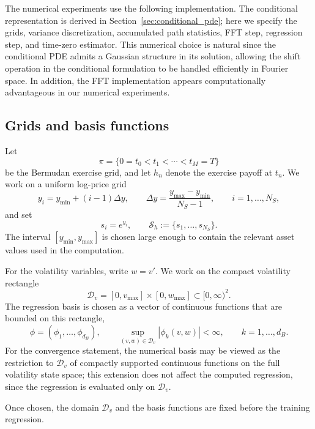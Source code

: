 \documentclass[pdflatex,sn-mathphys-num]{sn-jnl}
\theoremstyle{thmstyleone}%
\theoremstyle{thmstylethree}%
\theoremstyle{thmstyletwo}%
\begin{document}
The numerical experiments use the following implementation. The conditional
representation is derived in Section~\ref{sec:conditional_pde}; here we specify
the grids, variance discretization, accumulated path statistics, FFT step, regression step, and time-zero estimator. This numerical choice is natural since the conditional PDE admits a Gaussian structure in its solution, allowing the shift operation in the conditional formulation to be handled efficiently in Fourier space. In addition, the FFT implementation appears computationally advantageous in our numerical experiments.





\subsection{Grids and basis functions}
Let
$$
\pi=\{0=t_0<t_1<\cdots<t_M=T\}
$$
be the Bermudan exercise grid, and let $h_n$ denote the exercise payoff at
$t_n$. We work on a uniform log-price grid
$$
y_i=y_{\min}+(i-1)\Delta y,
\qquad
\Delta y=\frac{y_{\max}-y_{\min}}{N_S-1},
\qquad
i=1,\ldots,N_S,
$$
and set
$$
s_i=e^{y_i},
\qquad
\mathcal S_h:=\{s_1,\ldots,s_{N_S}\}.
$$
The interval $[y_{\min},y_{\max}]$ is chosen large enough to contain the
relevant asset values used in the computation.

For the volatility variables, write $w=v'$. We work on the compact volatility rectangle
\begin{equation}\label{eq:vol-domain}
\mathcal D_v=[0,v_{\max}]\times[0,w_{\max}]\subset[0,\infty)^2 .
\end{equation}
The regression basis is chosen as a vector of continuous functions that are bounded on this rectangle,
\begin{equation}\label{eq:vol-basis}
\phi=(\phi_1,\ldots,\phi_{d_B}), \qquad \sup_{(v,w)\in\mathcal D_v}|\phi_k(v,w)|<\infty,
\qquad k=1,\ldots,d_B.
\end{equation}
For the convergence statement, the numerical basis may be viewed as the restriction to $\mathcal D_v$ of compactly supported continuous functions on the full volatility state space; this extension does not affect the computed regression, since the regression is evaluated only on $\mathcal D_v$.

Once chosen, the domain $\mathcal D_v$ and the basis functions are fixed before
the training regression.
\end{document}
